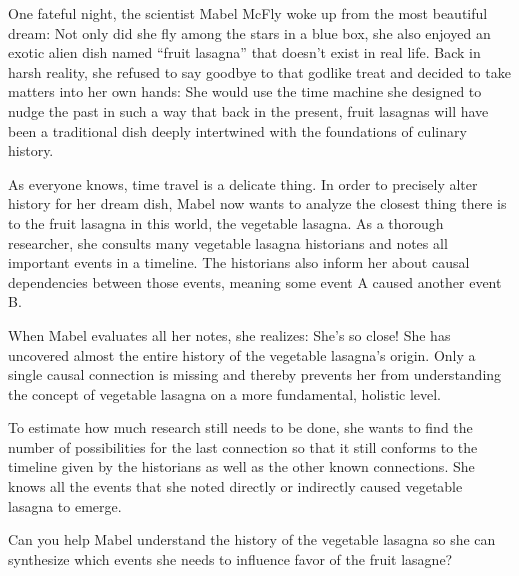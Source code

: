 



\makeheader


One fateful night, the scientist Mabel McFly woke up from the most beautiful dream: Not only did she fly among the stars in a blue box, she also enjoyed an exotic alien dish named “fruit lasagna” that doesn’t exist in real life. Back in harsh reality, she refused to say goodbye to that godlike treat and decided to take matters into her own hands: She would use the time machine she designed to nudge the past in such a way that back in the present, fruit lasagnas will have been a traditional dish deeply intertwined with the foundations of culinary history.

As everyone knows, time travel is a delicate thing. In order to precisely alter history for her dream dish, Mabel now wants to analyze the closest thing there is to the fruit lasagna in this world, the vegetable lasagna.
As a thorough researcher, she consults many vegetable lasagna historians and notes all important events in a timeline. The historians also inform her about causal dependencies between those events, meaning some event A caused another event B.

When Mabel evaluates all her notes, she realizes: She’s so close! She has uncovered almost the entire history of the vegetable lasagna’s origin. Only a single causal connection is missing and thereby prevents her from understanding the concept of vegetable lasagna on a more fundamental, holistic level.

To estimate how much research still needs to be done, she wants to find the number of possibilities for the last connection so that it still conforms to the timeline given by the historians as well as the other known connections. She knows all the events that she noted directly or indirectly caused vegetable lasagna to emerge.

Can you help Mabel understand the history of the vegetable lasagna so she can synthesize which events she needs to influence favor of the fruit lasagne?


